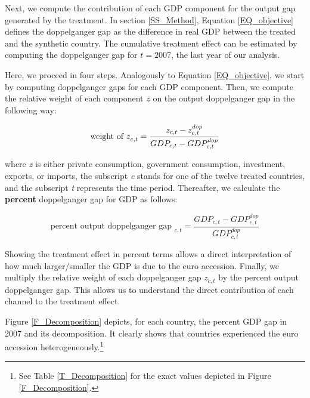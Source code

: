 \documentclass[12pt]{article}
\renewcommand{\vec}[1]{\mathbf{#1}}
\begin{document}

Next, we compute the contribution of each GDP component for the output gap generated by the treatment. In section \ref{SS_Method}, Equation \ref{EQ_objective} defines the doppelganger gap as the difference in real GDP between the treated and the synthetic country. The cumulative treatment effect can be estimated by computing the doppelganger gap for $t=2007$, the last year of our analysis.

Here, we proceed in four steps. Analogously to Equation \ref{EQ_objective}, we start by computing doppelganger gaps for each GDP component. Then, we compute the relative weight of each component $z$ on the output doppelganger gap in the following way:

\begin{equation}
\label{equation2}
\text{weight of \textit{z}}_{c,t}= \frac{z_{c,t} - z_{c,t}^{dop}}{GDP_{c,t} - GDP_{c,t}^{dop}}
\end{equation}

where \textit{z} is either private consumption, government consumption, investment, exports, or imports, the subscript \textit{c} stands for one of the twelve treated countries, and the subscript \textit{t} represents the time period. Thereafter, we calculate the \textbf{percent} doppelganger gap for GDP as follows:

\begin{equation}
\label{equation3}
\text{percent output doppelganger gap }_{c,t}= \frac{GDP_{c,t}-GDP_{c,t}^{dop}}{GDP_{c,t}^{dop}}
\end{equation}

Showing the treatment effect in percent terms allows a direct interpretation of how much larger/smaller the GDP is due to the euro accession. Finally, we multiply the relative weight of each doppelganger gap $z_{c,t}$ by the percent output doppelganger gap. This allows us to understand the direct contribution of each channel to the treatment effect.

Figure \ref{F_Decomposition} depicts, for each country, the percent GDP gap in 2007 and its decomposition. It clearly shows that countries experienced the euro accession heterogeneously.\footnote{See Table \ref{T_Decomposition} for the exact values depicted in Figure \ref{F_Decomposition}.}  
\end{document}
